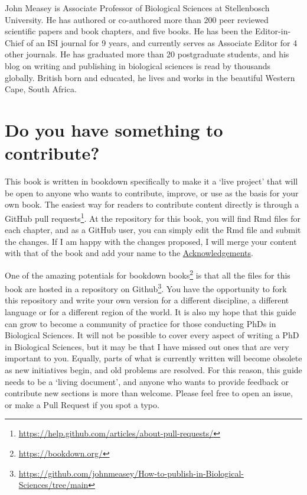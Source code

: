 \documentclass[
]{krantz}
\renewcommand{\href}[2]{#2\footnote{\url{#1}}}
\begin{document}
John Measey is Associate Professor of Biological Sciences at Stellenbosch University. He has authored or co-authored more than 200 peer reviewed scientific papers and book chapters, and five books. He has been the Editor-in-Chief of an ISI journal for 9 years, and currently serves as Associate Editor for 4 other journals. He has graduated more than 20 postgraduate students, and his blog on writing and publishing in biological sciences is read by thousands globally. British born and educated, he lives and works in the beautiful Western Cape, South Africa.

\hypertarget{contribute}{%
\section*{Do you have something to contribute?}\label{contribute}}


This book is written in bookdown \citep{xie2016bookdown} specifically to make it a `live project' that will be open to anyone who wants to contribute, improve, or use as the basis for your own book. The easiest way for readers to contribute content directly is through a \href{https://help.github.com/articles/about-pull-requests/}{GitHub pull requests}. At the repository for this book, you will find Rmd files for each chapter, and as a GitHub user, you can simply edit the Rmd file and submit the changes. If I am happy with the changes proposed, I will merge your content with that of the book and add your name to the \protect\hyperlink{acknowledge}{Acknowledgements}.

One of the amazing potentials for \href{https://bookdown.org/}{bookdown books} is that all the files for this book are hosted in a repository on \href{https://github.com/johnmeasey/How-to-publish-in-Biological-Sciences/tree/main}{Github}. You have the opportunity to fork this repository and write your own version for a different discipline, a different language or for a different region of the world. It is also my hope that this guide can grow to become a community of practice for those conducting PhDs in Biological Sciences. It will not be possible to cover every aspect of writing a PhD in Biological Sciences, but it may be that I have missed out ones that are very important to you. Equally, parts of what is currently written will become obsolete as new initiatives begin, and old problems are resolved. For this reason, this guide needs to be a `living document', and anyone who wants to provide feedback or contribute new sections is more than welcome. Please feel free to open an issue, or make a Pull Request if you spot a typo.
\end{document}
